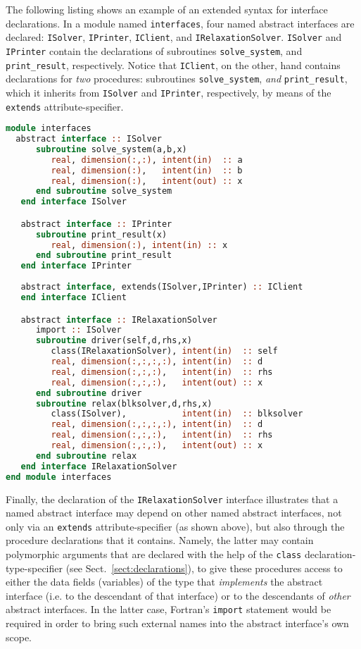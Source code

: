 \documentclass[11pt,oneside]{article}
\begin{document}
The following listing shows an example of an extended syntax for
interface declarations. In a module named \texttt{interfaces}, four
named abstract interfaces are declared: \texttt{ISolver},
\texttt{IPrinter}, \texttt{IClient}, and
\texttt{IRelaxationSolver}. \texttt{ISolver} and \texttt{IPrinter}
contain the declarations of subroutines \texttt{solve\_system}, and
\texttt{print\_result}, respectively. Notice that \texttt{IClient}, on
the other, hand contains declarations for \emph{two} procedures:
subroutines \texttt{solve\_system}, \emph{and} \texttt{print\_result},
which it inherits from \texttt{ISolver} and \texttt{IPrinter},
respectively, by means of the \texttt{extends} attribute-specifier.

\begin{lstlisting}[language=Fortran]
module interfaces
  abstract interface :: ISolver
      subroutine solve_system(a,b,x)
         real, dimension(:,:), intent(in)  :: a
         real, dimension(:),   intent(in)  :: b
         real, dimension(:),   intent(out) :: x
      end subroutine solve_system
   end interface ISolver

   abstract interface :: IPrinter
      subroutine print_result(x)
         real, dimension(:), intent(in) :: x
      end subroutine print_result
   end interface IPrinter
   
   abstract interface, extends(ISolver,IPrinter) :: IClient
   end interface IClient

   abstract interface :: IRelaxationSolver
      import :: ISolver
      subroutine driver(self,d,rhs,x)
         class(IRelaxationSolver), intent(in)  :: self
         real, dimension(:,:,:,:), intent(in)  :: d
         real, dimension(:,:,:),   intent(in)  :: rhs
         real, dimension(:,:,:),   intent(out) :: x
      end subroutine driver
      subroutine relax(blksolver,d,rhs,x)
         class(ISolver),           intent(in)  :: blksolver
         real, dimension(:,:,:,:), intent(in)  :: d
         real, dimension(:,:,:),   intent(in)  :: rhs
         real, dimension(:,:,:),   intent(out) :: x
      end subroutine relax
   end interface IRelaxationSolver
end module interfaces
\end{lstlisting}
\label{list:interface}
Finally, the declaration of the \texttt{IRelaxationSolver} interface
illustrates that a named abstract interface may depend on other named
abstract interfaces, not only via an \texttt{extends}
attribute-specifier (as shown above), but also through the procedure
declarations that it contains. Namely, the latter may contain
polymorphic arguments that are declared with the help of the
\texttt{class} declaration-type-specifier (see
Sect.~\ref{sect:declarations}), to give these procedures access to
either the data fields (variables) of the type that \emph{implements}
the abstract interface (i.e. to the descendant of that interface) or
to the descendants of \emph{other} abstract interfaces. In the latter
case, Fortran's \texttt{import} statement would be required in order
to bring such external names into the abstract interface's own scope.
\end{document}
